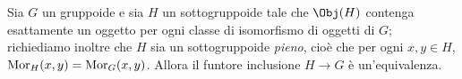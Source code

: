 \documentclass[english,course]{Notes}
\begin{document}
%  

\begin{theorem}
  Sia $G$ un gruppoide e sia $H$ un sottogruppoide tale che $\Obj(H)$ contenga esattamente un oggetto per ogni classe di isomorfismo di oggetti di $G$; richiediamo inoltre che $H$ sia un sottogruppoide \emph{pieno}, cioè che per ogni $x,y∈H$, $\operatorname{Mor}_H(x,y) = \operatorname{Mor}_G(x,y)$. Allora il funtore inclusione $H → G$ è un'equivalenza.
\end{theorem}
\end{document}
